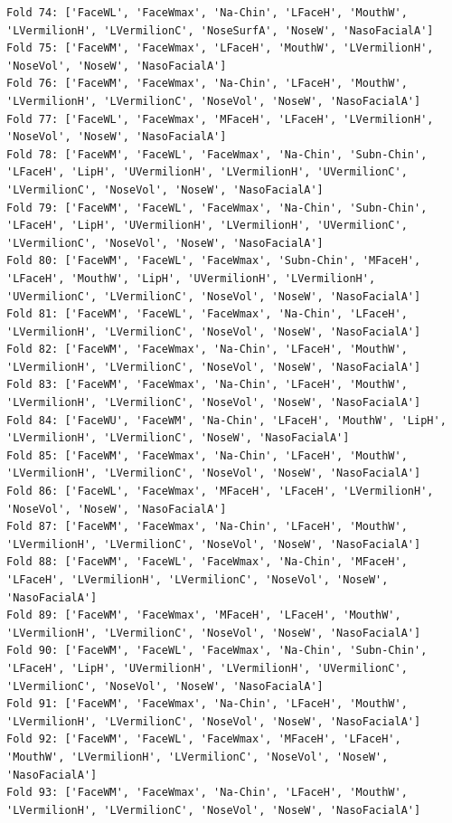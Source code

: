 \documentclass[12pt,a4paper]{article}
\begin{document}
\begin{verbatim}
Fold 74: ['FaceWL', 'FaceWmax', 'Na-Chin', 'LFaceH', 'MouthW', 'LVermilionH', 'LVermilionC', 'NoseSurfA', 'NoseW', 'NasoFacialA']
Fold 75: ['FaceWM', 'FaceWmax', 'LFaceH', 'MouthW', 'LVermilionH', 'NoseVol', 'NoseW', 'NasoFacialA']
Fold 76: ['FaceWM', 'FaceWmax', 'Na-Chin', 'LFaceH', 'MouthW', 'LVermilionH', 'LVermilionC', 'NoseVol', 'NoseW', 'NasoFacialA']
Fold 77: ['FaceWL', 'FaceWmax', 'MFaceH', 'LFaceH', 'LVermilionH', 'NoseVol', 'NoseW', 'NasoFacialA']
Fold 78: ['FaceWM', 'FaceWL', 'FaceWmax', 'Na-Chin', 'Subn-Chin', 'LFaceH', 'LipH', 'UVermilionH', 'LVermilionH', 'UVermilionC', 'LVermilionC', 'NoseVol', 'NoseW', 'NasoFacialA']
Fold 79: ['FaceWM', 'FaceWL', 'FaceWmax', 'Na-Chin', 'Subn-Chin', 'LFaceH', 'LipH', 'UVermilionH', 'LVermilionH', 'UVermilionC', 'LVermilionC', 'NoseVol', 'NoseW', 'NasoFacialA']
Fold 80: ['FaceWM', 'FaceWL', 'FaceWmax', 'Subn-Chin', 'MFaceH', 'LFaceH', 'MouthW', 'LipH', 'UVermilionH', 'LVermilionH', 'UVermilionC', 'LVermilionC', 'NoseVol', 'NoseW', 'NasoFacialA']
Fold 81: ['FaceWM', 'FaceWL', 'FaceWmax', 'Na-Chin', 'LFaceH', 'LVermilionH', 'LVermilionC', 'NoseVol', 'NoseW', 'NasoFacialA']
Fold 82: ['FaceWM', 'FaceWmax', 'Na-Chin', 'LFaceH', 'MouthW', 'LVermilionH', 'LVermilionC', 'NoseVol', 'NoseW', 'NasoFacialA']
Fold 83: ['FaceWM', 'FaceWmax', 'Na-Chin', 'LFaceH', 'MouthW', 'LVermilionH', 'LVermilionC', 'NoseVol', 'NoseW', 'NasoFacialA']
Fold 84: ['FaceWU', 'FaceWM', 'Na-Chin', 'LFaceH', 'MouthW', 'LipH', 'LVermilionH', 'LVermilionC', 'NoseW', 'NasoFacialA']
Fold 85: ['FaceWM', 'FaceWmax', 'Na-Chin', 'LFaceH', 'MouthW', 'LVermilionH', 'LVermilionC', 'NoseVol', 'NoseW', 'NasoFacialA']
Fold 86: ['FaceWL', 'FaceWmax', 'MFaceH', 'LFaceH', 'LVermilionH', 'NoseVol', 'NoseW', 'NasoFacialA']
Fold 87: ['FaceWM', 'FaceWmax', 'Na-Chin', 'LFaceH', 'MouthW', 'LVermilionH', 'LVermilionC', 'NoseVol', 'NoseW', 'NasoFacialA']
Fold 88: ['FaceWM', 'FaceWL', 'FaceWmax', 'Na-Chin', 'MFaceH', 'LFaceH', 'LVermilionH', 'LVermilionC', 'NoseVol', 'NoseW', 'NasoFacialA']
Fold 89: ['FaceWM', 'FaceWmax', 'MFaceH', 'LFaceH', 'MouthW', 'LVermilionH', 'LVermilionC', 'NoseVol', 'NoseW', 'NasoFacialA']
Fold 90: ['FaceWM', 'FaceWL', 'FaceWmax', 'Na-Chin', 'Subn-Chin', 'LFaceH', 'LipH', 'UVermilionH', 'LVermilionH', 'UVermilionC', 'LVermilionC', 'NoseVol', 'NoseW', 'NasoFacialA']
Fold 91: ['FaceWM', 'FaceWmax', 'Na-Chin', 'LFaceH', 'MouthW', 'LVermilionH', 'LVermilionC', 'NoseVol', 'NoseW', 'NasoFacialA']
Fold 92: ['FaceWM', 'FaceWL', 'FaceWmax', 'MFaceH', 'LFaceH', 'MouthW', 'LVermilionH', 'LVermilionC', 'NoseVol', 'NoseW', 'NasoFacialA']
Fold 93: ['FaceWM', 'FaceWmax', 'Na-Chin', 'LFaceH', 'MouthW', 'LVermilionH', 'LVermilionC', 'NoseVol', 'NoseW', 'NasoFacialA']

\end{verbatim}
\end{document}
